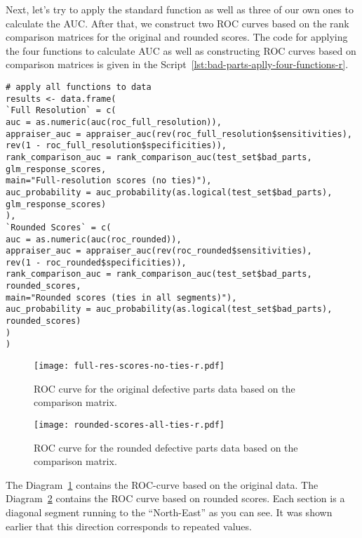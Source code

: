 \documentclass[]{scrreprt}
\begin{document}
Next, let's try to apply the standard function as well as three of our own ones to calculate the AUC. After that, we construct two ROC curves based on the rank comparison matrices for the original and rounded scores. The code for applying the four functions to calculate AUC as well as constructing ROC curves based on comparison matrices is given in the Script~\ref{lst:bad-parts-aplly-four-functions-r}.
%
\begin{lstlisting}[float=htp, caption = Using four functions to calculate AUC and plot ROC curves based on comparison matrices for original and rounded scores, firstnumber=1, label= lst:bad-parts-aplly-four-functions-r]
# apply all functions to data
results <- data.frame(
`Full Resolution` = c(
auc = as.numeric(auc(roc_full_resolution)),
appraiser_auc = appraiser_auc(rev(roc_full_resolution$sensitivities),
rev(1 - roc_full_resolution$specificities)),
rank_comparison_auc = rank_comparison_auc(test_set$bad_parts,
glm_response_scores, 
main="Full-resolution scores (no ties)"),
auc_probability = auc_probability(as.logical(test_set$bad_parts),
glm_response_scores)
),
`Rounded Scores` = c( 
auc = as.numeric(auc(roc_rounded)),
appraiser_auc = appraiser_auc(rev(roc_rounded$sensitivities),
rev(1 - roc_rounded$specificities)),
rank_comparison_auc = rank_comparison_auc(test_set$bad_parts, rounded_scores,
main="Rounded scores (ties in all segments)"),
auc_probability = auc_probability(as.logical(test_set$bad_parts),
rounded_scores)
)
)
\end{lstlisting}
%
\begin{figure}[htp]
	\centering
	\texttt{[image: full-res-scores-no-ties-r.pdf]}
	\caption{ROC curve for the original defective parts data based on the comparison matrix.}
	\label{fig:bad-parts-ROC-original-r}
\end{figure}
%
\begin{figure}[htp]
	\centering
	\texttt{[image: rounded-scores-all-ties-r.pdf]}
	\caption{ROC curve for the rounded defective parts data based on the comparison matrix.}
	\label{fig:bad-parts-ROC-rounded-r}
\end{figure}
%

The Diagram~\ref{fig:bad-parts-ROC-original-r} contains the ROC-curve based on the original data. The Diagram~\ref{fig:bad-parts-ROC-rounded-r} contains the ROC curve based on rounded scores. Each section is a diagonal segment running to the ``North-East'' as you can see. It was shown earlier that this direction corresponds to repeated values.
\end{document}
